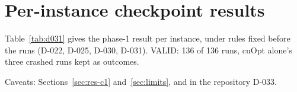 \section{Per-instance checkpoint results}\label{app:c1}
Table~\ref{tab:d031} gives the phase-1 result per instance, under rules fixed before the runs (D-022, D-025, D-030,
D-031). VALID: 136 of 136 runs, cuOpt alone's three crashed runs kept as outcomes.


Caveats: Sections~\ref{sec:res-c1} and~\ref{sec:limits}, and in the repository D-033.
